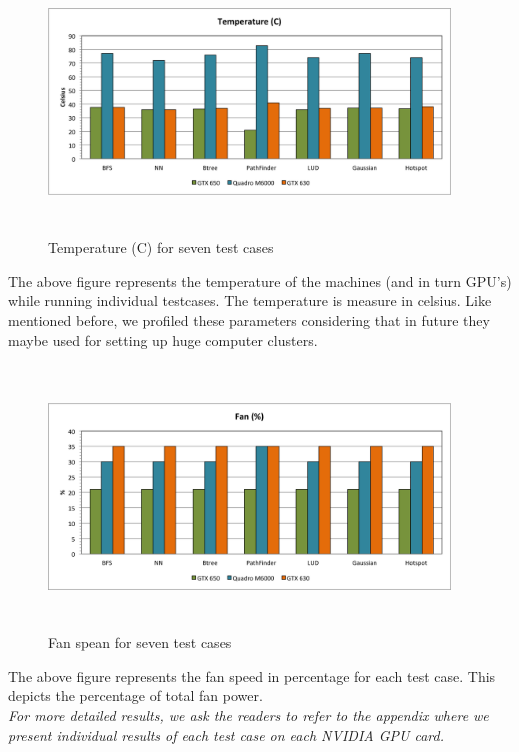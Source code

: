 \documentclass[paper=a4, fontsize=11pt]{scrartcl}
\numberwithin{equation}{section}		%
\numberwithin{figure}{section}			%
\numberwithin{table}{section}				%
\begin{document}
\begin{figure}[!h]
\centering
\includegraphics[width=0.95\textwidth,height=7cm]{../imgs/temp.png}
\caption{Temperature (C) for seven test cases}
\label{fig:temp}
\end{figure}

The above figure represents the temperature of the machines (and in turn GPU's) while running individual testcases. The temperature is measure in celsius. Like mentioned before, we profiled these parameters considering that in future they maybe used for setting up huge computer clusters.

\begin{figure}[!h]
\centering
\includegraphics[width=0.95\textwidth,height=7cm]{../imgs/fan.png}
\caption{Fan spean for seven test cases}
\label{fig:fan}
\end{figure}

The above figure represents the fan speed in percentage for each test case. This depicts the percentage of total fan power. \\

\emph{For more detailed results, we ask the readers to refer to the appendix where we present individual results of each test case on each NVIDIA GPU card.}
 
\end{document}
